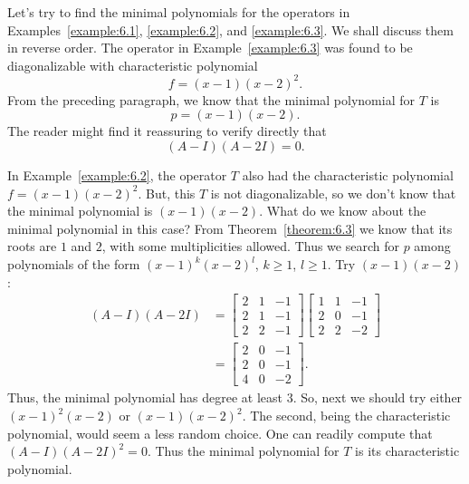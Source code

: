 \begin{example}
    Let's try to find the minimal polynomials for the operators in Examples~\ref{example:6.1}, \ref{example:6.2}, and \ref{example:6.3}. We shall discuss them in reverse order. The operator in Example~\ref{example:6.3} was found to be diagonalizable with characteristic polynomial
    \begin{equation*}
        f=\left(x-1\right)\left(x-2\right)^2.
    \end{equation*}
    From the preceding paragraph, we know that the minimal polynomial for \(T\) is
    \begin{equation*}
        p=\left(x-1\right)\left(x-2\right).
    \end{equation*}
    The reader might find it reassuring to verify directly that
    \begin{equation*}
        \left(A-I\right)\left(A-2I\right)=0.
    \end{equation*}

    In Example~\ref{example:6.2}, the operator \(T\) also had the characteristic polynomial \(f=\left(x-1\right)\left(x-2\right)^2\). But, this \(T\) is not diagonalizable, so we don't know that the minimal polynomial is \(\left(x-1\right)\left(x-2\right)\). What do we know about the minimal polynomial in this case? From Theorem~\ref{theorem:6.3} we know that its roots are \(1\) and \(2\), with some multiplicities allowed. Thus we search for \(p\) among polynomials of the form \(\left(x-1\right)^k\left(x-2\right)^l\), \(k\geqslant1\), \(l\geqslant1\). Try \(\left(x-1\right)\left(x-2\right)\):
    \begin{align*}
        \left(A-I\right)\left(A-2I\right)&=
        \begin{bmatrix}
            2 & 1 & -1 \\
            2 & 1 & -1 \\
            2 & 2 & -1
        \end{bmatrix}
        \begin{bmatrix}
            1 & 1 & -1 \\
            2 & 0 & -1 \\
            2 & 2 & -2
        \end{bmatrix}
        \\
                                         &=
                                         \begin{bmatrix}
                                             2 & 0 & -1 \\
                                             2 & 0 & -1 \\
                                             4 & 0 & -2
                                         \end{bmatrix}
                                         .
    \end{align*}
    Thus, the minimal polynomial has degree at least \(3\). So, next we should try either \(\left(x-1\right)^2\left(x-2\right)\) or \(\left(x-1\right)\left(x-2\right)^2\). The second, being the characteristic polynomial, would seem a less random choice. One can readily compute that \(\left(A-I\right)\left(A-2I\right)^2=0\). Thus the minimal polynomial for \(T\) is its characteristic polynomial.


\end{example}
